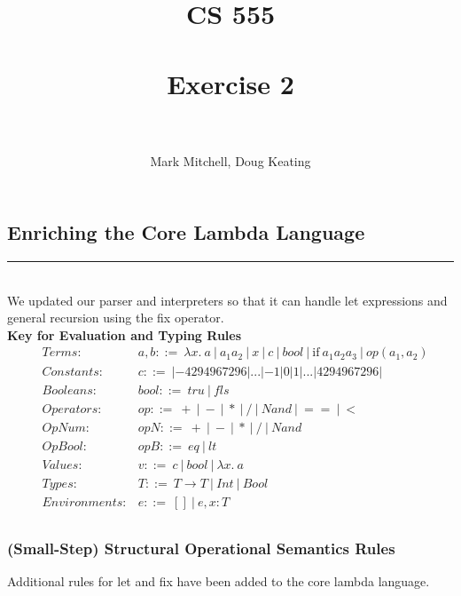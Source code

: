 \documentclass[10pt]{article}
\title{ 
	\normalfont \normalsize 
	\textsc{CS 555} \\ [25pt] %
	\horrule{0.5pt} \\[0.4cm] %
	\huge Exercise 2 \\ %
	\horrule{2pt} \\[0.5cm] %
}
\author{Mark Mitchell, Doug Keating} %
\date{} %
\newcommand{\horrule}[1]{\rule{\linewidth}{#1}}
\begin{document}
	

	
	
	\setcounter{section}{2}
	
	\maketitle
	
	\subsection{Enriching the Core Lambda Language}
	\label{sec:core}
	\horrule{1pt} \\[0.2cm]
	
\noindent 	We updated our parser and interpreters so that it can handle let expressions and	general recursion using the fix operator.\\
	
	\textbf{Key for Evaluation and Typing Rules}\\
	\begin{align*}
	& Terms: & a,b::=\ \lambda x.\ a\ |\ a_1 a_2\ |\ x\ |\ c\ |\ bool\ |\ \text{if}\ a_1 a_2 a_3\ |\ op(a_1, a_2)\\
	&Constants: & c::=\ |-4294967296|...|-1|0|1|...|4294967296|\\
	&Booleans: & bool::=\ tru\ |\ fls\\
	&Operators: & op::=\ +\ |\ -\ |\ *\ |\ /\ |\ Nand\ |\ ==\ |\ <\\
	&OpNum: & opN::=\ +\ |\ -\ |\ *\ |\ /\ |\ Nand\\
	&OpBool:& opB::=\ eq\ |\ lt\\
	&Values:& v::=\ c\ |\ bool\ |\ \lambda x.\ a\\
	& Types: & T::=\ T\rightarrow T\ |\ Int\ |\ Bool\\
	&Environments: & e::=\ []\ |\ e,x:T\\
	\end{align*}
	
	
	
	\subsubsection*{(Small-Step) Structural Operational Semantics Rules}
	
	\noindent Additional rules for let and fix have been added to the core lambda language.\\
	

	
	
\end{document}
